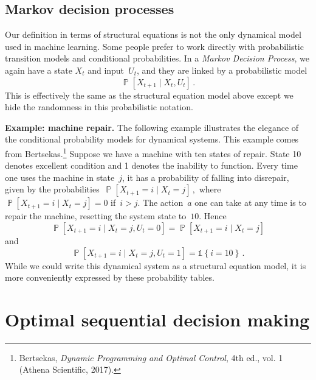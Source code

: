 \documentclass{tufte-book}
\begin{document}
\hypertarget{markov-decision-processes}{%
\subsection{Markov decision processes}\label{markov-decision-processes}}


Our definition in terms of structural equations is not the only
dynamical model used in machine learning. Some people prefer to work
directly with probabilistic transition models and conditional
probabilities. In a \emph{Markov Decision Process}, we again have a
state \(X_t\) and input~\(U_t\), and they are linked by a probabilistic
model \[
    \mathop\mathbb{P}[X_{t+1}\mid X_t,U_t]\,.
\] This is effectively the same as the structural equation model above
except we hide the randomness in this probabilistic notation.

\textbf{Example: machine repair.} The following example illustrates the
elegance of the conditional probability models for dynamical systems.
This example comes from Bertsekas.\footnote{Bertsekas, \emph{Dynamic
  Programming and Optimal Control}, 4th ed., vol. 1 (Athena Scientific,
  2017).} Suppose we have a machine with ten states of repair. State 10
denotes excellent condition and 1 denotes the inability to function.
Every time one uses the machine in state~\(j\), it has a probability of
falling into disrepair, given by the
probabilities~\(\mathop\mathbb{P}[X_{t+1} = i\mid X_t=j]\,,\) where
\(\mathop\mathbb{P}[X_{t+1}=i\mid X_t=j]=0\) if~\(i>j\). The
action~\(a\) one can take at any time is to repair the machine,
resetting the system state to~\(10\). Hence \[
\mathop\mathbb{P}[X_{t+1}=i\mid X_{t}=j,U_t=0] = \mathop\mathbb{P}[X_{t+1}=i\mid X_{t}=j]
\] and \[
\mathop\mathbb{P}[X_{t+1}=i\mid X_{t}=j,U_t=1] = \mathbb{1}\left\{ i=10 \right\} \,.
\] While we could write this dynamical system as a structural equation
model, it is more conveniently expressed by these probability tables.

\hypertarget{optimal-sequential-decision-making}{%
\section{Optimal sequential decision
making}\label{optimal-sequential-decision-making}}
\end{document}
